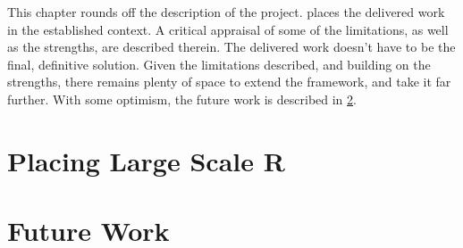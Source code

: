 This chapter rounds off the description of the project.
 places the delivered work in the established context.
A critical appraisal of some of the limitations, as well as the strengths, are described therein.
The delivered work doesn't have to be the final, definitive solution.
Given the limitations described, and building on the strengths, there remains plenty of space to extend the \lsr{} framework, and take it far further.
With some optimism, the future work is described in \cref{sec:future-work}.

\section{Placing Large Scale R}\label{sec:limitations}

\section{Future Work}\label{sec:future-work}


